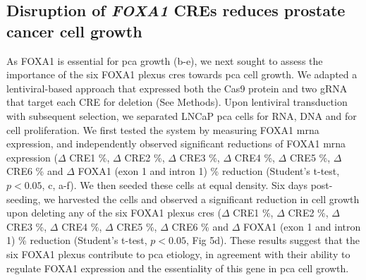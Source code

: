 
\subsection{Disruption of \emph{FOXA1} CREs reduces prostate cancer cell growth}

As FOXA1 is essential for \gls{pca} growth (b-e), we next sought to assess the importance of the six FOXA1 plexus \glspl{cre} towards \gls{pca} cell growth.
We adapted a lentiviral-based approach that expressed both the Cas9 protein and two gRNA that target each CRE for deletion (See Methods).
Upon lentiviral transduction with subsequent selection, we separated LNCaP \gls{pca} cells for RNA, DNA and for cell proliferation.
We first tested the system by measuring FOXA1 \gls{mrna} expression, and independently observed significant reductions of FOXA1 \gls{mrna} expression ($\Delta$ CRE1 \%, $\Delta$ CRE2 \%, $\Delta$ CRE3 \%, $\Delta$ CRE4 \%, $\Delta$ CRE5 \%, $\Delta$ CRE6 \% and $\Delta$ FOXA1 (exon 1 and intron 1) \% reduction (Student's t-test, $p<0.05$, c, a-f).
We then seeded these cells at equal density.
Six days post-seeding, we harvested the cells and observed a significant reduction in cell growth upon deleting any of the six FOXA1 plexus \glspl{cre} ($\Delta$ CRE1 \%, $\Delta$ CRE2 \%, $\Delta$ CRE3 \%, $\Delta$ CRE4 \%, $\Delta$ CRE5 \%, $\Delta$ CRE6 \% and $\Delta$ FOXA1 (exon 1 and intron 1) \% reduction (Student's t-test, $p<0.05$, Fig 5d).
These results suggest that the six FOXA1 plexus contribute to \gls{pca} etiology, in agreement with their ability to regulate FOXA1 expression and the essentiality of this gene in \gls{pca} cell growth.

